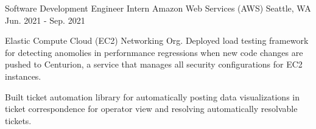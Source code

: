 \cventry
    {Software Development Engineer Intern} %
    {Amazon Web Services (AWS)} %
    {Seattle, WA} %
    {Jun. 2021 - Sep. 2021} %
    {
      \begin{cvitems} %
        \item {Elastic Compute Cloud (EC2) Networking Org. Deployed load testing 
        framework for detecting anomolies in perfornmance regressions when 
        new code changes are pushed to Centurion, a service that manages 
        all security configurations for EC2 instances.}
        \item {Built ticket automation library for automatically 
        posting data visualizations in ticket correspondence for operator view 
        and resolving automatically resolvable tickets.}
      \end{cvitems}
    } 